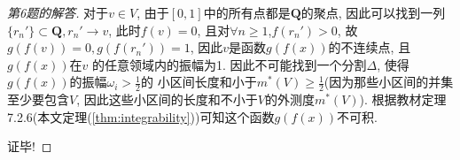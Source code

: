 \documentclass[a4paper,12pt]{article}
\theoremstyle{nonumberplain}
\begin{document}
\begin{proof}[第6题的解答]
  对于$v\in V$, 由于$[0,1]$中的所有点都是$\mathbf Q$的聚点, 因此可以找到一列
  $\{r_n'\}\subset \mathbf Q, r_n'\to v$, 此时$f(v)=0$, 且对$\forall n\geq 1$,$f(r_n')>0$,
  故$g(f(v))=0, g(f(r_n'))=1$, 因此$v$是函数$g(f(x))$的不连续点, 且$g(f(x))$在$v$
  的任意领域内的振幅为1.
  因此不可能找到一个分割$\Delta$, 使得$g(f(x))$的振幅$\omega_i>\frac{1}{2}$的
  小区间长度和小于$m^*(V)\geq \frac{1}{2}$(因为那些小区间的并集至少要包含$V$, 
  因此这些小区间的长度和不小于$V$的外测度$m^*(V)$).
  根据教材定理7.2.6(本文定理(\ref{thm:integrability}))可知这个函数$g(f(x))$不可积.

  证毕!

\end{proof}

%

%
\end{document}
